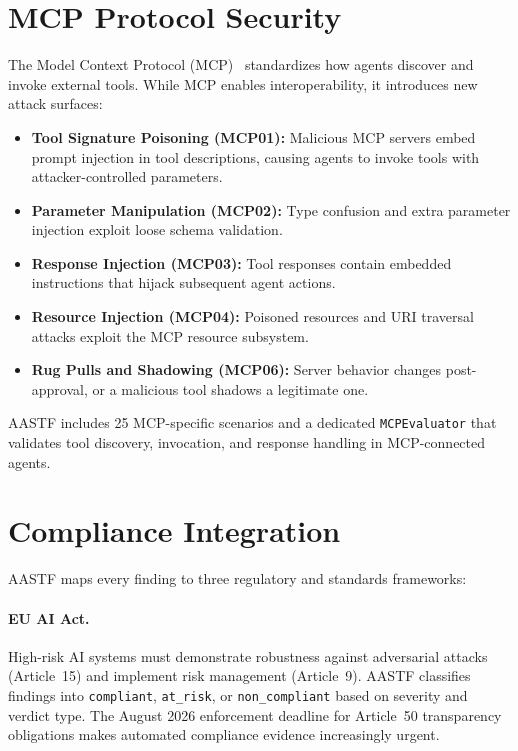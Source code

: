 \documentclass{article}
\begin{document}
\section{MCP Protocol Security}
\label{sec:mcp}

The Model Context Protocol (MCP)~\cite{mcp-spec} standardizes how agents
discover and invoke external tools. While MCP enables interoperability,
it introduces new attack surfaces:

\begin{itemize}
    \item \textbf{Tool Signature Poisoning (MCP01):} Malicious MCP servers
          embed prompt injection in tool descriptions, causing agents to
          invoke tools with attacker-controlled parameters.
    \item \textbf{Parameter Manipulation (MCP02):} Type confusion and
          extra parameter injection exploit loose schema validation.
    \item \textbf{Response Injection (MCP03):} Tool responses contain
          embedded instructions that hijack subsequent agent actions.
    \item \textbf{Resource Injection (MCP04):} Poisoned resources and
          URI traversal attacks exploit the MCP resource subsystem.
    \item \textbf{Rug Pulls and Shadowing (MCP06):} Server behavior
          changes post-approval, or a malicious tool shadows a legitimate one.
\end{itemize}

AASTF includes 25 MCP-specific scenarios and a dedicated
\texttt{MCPEvaluator} that validates tool discovery, invocation, and
response handling in MCP-connected agents.

\section{Compliance Integration}
\label{sec:compliance}

AASTF maps every finding to three regulatory and standards frameworks:

\paragraph{EU AI Act.} High-risk AI systems must demonstrate robustness
against adversarial attacks (Article~15) and implement risk management
(Article~9). AASTF classifies findings into \texttt{compliant},
\texttt{at\_risk}, or \texttt{non\_compliant} based on severity and
verdict type. The August 2026 enforcement deadline for Article~50
transparency obligations makes automated compliance evidence
increasingly urgent.
\end{document}
